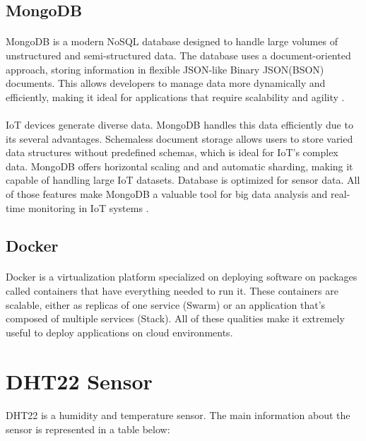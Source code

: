 \subsection{MongoDB}%
\paragraph{}MongoDB is a modern NoSQL database designed to handle large volumes of unstructured and semi-structured data. The database uses a document-oriented approach, storing information in flexible JSON-like Binary JSON(BSON) documents. This allows developers to manage data more dynamically and efficiently, making it ideal for applications that require scalability and agility \cite{mongodb:doc_1}.
\paragraph{}IoT devices generate diverse data. MongoDB handles this data efficiently due to its several advantages. Schemaless document storage allows users to store varied data structures without predefined schemas, which is ideal for IoT's complex data. MongoDB offers horizontal scaling and and automatic sharding, making it capable of handling large IoT datasets. Database is optimized for sensor data. All of those features make MongoDB a valuable tool for big data analysis and real-time monitoring in IoT systems \cite{mongodb:iot}. 

\subsection{Docker}%
\paragraph{} Docker is a virtualization platform specialized on deploying software on packages called containers that have everything needed to run it. These containers are scalable, either as replicas of one service (Swarm) or an application that's composed of multiple services (Stack). All of these qualities make it extremely useful to deploy applications on cloud environments.
\newpage
\section{DHT22 Sensor}

\paragraph{}DHT22 is a humidity and temperature sensor. The main information about the sensor is represented in a table below:

